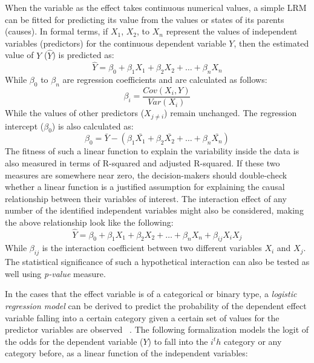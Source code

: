 \documentclass{sfuthesis}
\begin{document}
When the variable as the effect takes continuous numerical values, a simple LRM can be fitted for predicting its value from the values or states of its parents (causes). In formal terms, if $X_1$, $X_2$, to $X_n$ represent the values of independent variables (predictors) for the continuous dependent variable $Y$, then the estimated value of $Y$ ($\hat{Y}$) is predicted as:
\begin{equation}
    \hat{Y}=\beta_0 + \beta_1 X_1 + \beta_2 X_2 +\dots+ \beta_n X_n
\end{equation}
While $\beta_0$ to $\beta_n$ are regression coefficients and are calculated as follows:
\begin{equation}
    \beta_i=\frac{Cov(X_i,Y)}{Var(X_i)}
\end{equation}
While the values of other predictors ($X_{j\neq i}$) remain unchanged. The regression intercept ($\beta_0$) is also calculated as:
\begin{equation}
    \beta_0=\bar{Y} - (\beta_1 \bar{X_1} + \beta_2 \bar{X_2} +\dots+ \beta_n \bar{X_n})
\end{equation}
The fitness of such a linear function to explain the variability inside the data is also measured in terms of R-squared and adjusted R-squared. If these two measures are somewhere near zero, the decision-makers should double-check whether a linear function is a justified assumption for explaining the causal relationship between their variables of interest. The interaction effect of any number of the identified independent variables might also be considered, making the above relationship look like the following:
\begin{equation}
    \hat{Y}=\beta_0 + \beta_1 X_1 + \beta_2 X_2 +\dots+ \beta_n X_n + \beta_{ij}X_iX_j
\end{equation}
While $\beta_{ij}$ is the interaction coefficient between two different variables $X_i$ and $X_j$. The statistical significance of such a hypothetical interaction can also be tested as well using \textit{p-value} measure.\par
In the cases that the effect variable is of a categorical or binary type, a \textit{logistic regression model} can be derived to predict the probability of the dependent effect variable falling into a certain category given a certain set of values for the predictor variables are observed ~\cite{bender_ordinal_1997}. The following formalization models the logit of the odds for the dependent variable ($Y$) to fall into the $i^th$ category or any category before, as a linear function of the independent variables: 
\end{document}
